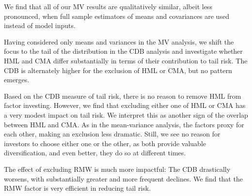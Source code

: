 We find that all of our MV results are qualitatively similar, albeit less pronounced, when full sample estimators of means and covariances are used instead of model inputs.

Having considered only means and variances in the MV analysis, we shift the focus to the tail of the distribution in the CDB analysis and investigate whether HML and CMA differ substantially in terms of their contribution to tail risk. The CDB is alternately higher for the exclusion of HML or CMA, but no pattern emerges. 

Based on the CDB measure of tail risk, there is no reason to remove HML from factor investing. However, we find that excluding either one of HML or CMA has a very modest impact on tail risk. We interpret this as another sign of the overlap between HML and CMA. As in the mean-variance analysis, the factors proxy for each other, making an exclusion less dramatic. Still, we see no reason for investors to choose either one or the other, as both provide valuable diversification, and even better, they do so at different times.

The effect of excluding RMW is much more impactful: The CDB drastically worsens, with substantially greater and more frequent declines. We find that the RMW factor is very efficient in reducing tail risk.
 
